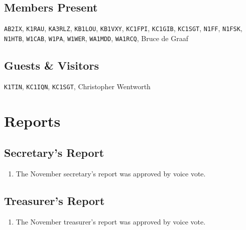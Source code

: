 \documentclass[10pt,letterpaper]{article}
\begin{document}
\subsection{Members Present}
\texttt{AB2IX},
\texttt{K1RAU},
\texttt{KA3RLZ},
\texttt{KB1LOU},
\texttt{KB1VXY},
\texttt{KC1FPI},
\texttt{KC1GIB},
\texttt{KC1SGT},
\texttt{N1FF},
\texttt{N1FSK},
\texttt{N1HTB},
\texttt{W1CAB},
\texttt{W1PA},
\texttt{W1WER},
\texttt{WA1MDD},
\texttt{WA1RCQ},
Bruce de Graaf

\subsection{Guests \& Visitors}
\texttt{K1TIN},
\texttt{KC1IQN},
\texttt{KC1SGT},
Christopher Wentworth


\section{Reports}

\subsection{Secretary's Report}
\begin{enumerate}
  \item The November secretary's report was approved by voice vote.
\end{enumerate}

\newpage
\subsection{Treasurer's Report}
\begin{enumerate}
  \item The November treasurer's report was approved by voice vote.
\end{enumerate}
\end{document}
